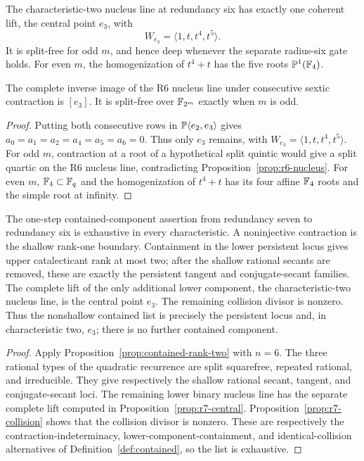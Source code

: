 The characteristic-two nucleus line at redundancy six has exactly one
coherent lift, the central point $e_3$, with
\[
W_{e_3}=\langle1,t,t^4,t^5\rangle.
\]
It is split-free for odd \(m\), and hence deep whenever the separate
radius-six gate holds.  For even \(m\), the homogenization of
\(t^4+t\) has the five roots \(\mathbb P^1(\mathbb F_4)\).

\begin{proposition}\label{prop:r7-central}%
%
The complete inverse image of the R6 nucleus line under consecutive
sextic contraction is $[e_3]$.  It is split-free over $\mathbb F_{2^m}$
exactly when $m$ is odd.
\end{proposition}

\begin{proof}
Putting both consecutive rows in
$\mathbb P\langle e_2,e_3\rangle$ gives
$a_0=a_1=a_2=a_4=a_5=a_6=0$.  Thus only $e_3$ remains, with
$W_{e_3}=\langle1,t,t^4,t^5\rangle$.  For odd $m$, contraction at a
root of a hypothetical split quintic would give a split quartic on the
R6 nucleus line, contradicting Proposition~\ref{prop:r6-nucleus}.  For
even $m$, $\mathbb F_4\subset\mathbb F_q$ and the homogenization of $t^4+t$ has its
four affine $\mathbb F_4$ roots and the simple root at infinity.
\end{proof}

\begin{corollary}
\label{cor:r7-contained}%
%
The one-step contained-component assertion from redundancy seven to
redundancy six is exhaustive in every characteristic.  A noninjective
contraction is the shallow rank-one
boundary.  Containment in the lower persistent locus gives upper
catalecticant rank at most two; after the shallow rational secants are
removed, these are exactly the persistent tangent and conjugate-secant
families.  The complete lift of the only additional lower component,
the characteristic-two nucleus line, is the central point \(e_3\).
The remaining collision divisor is nonzero.  Thus the
nonshallow contained list is precisely the persistent locus and, in
characteristic two, \(e_3\); there is no further contained component.
\end{corollary}

\begin{proof}
Apply Proposition~\ref{prop:contained-rank-two} with $n=6$.  The three
rational types of the quadratic recurrence are split squarefree,
repeated rational, and irreducible.  They give respectively the shallow
rational secant, tangent, and conjugate-secant loci.  The remaining
lower binary nucleus line has the separate complete lift computed in
Proposition~\ref{prop:r7-central}.  Proposition~\ref{prop:r7-collision}
shows that the collision divisor is nonzero.  These are respectively
the contraction-indeterminacy, lower-component-containment, and
identical-collision alternatives of Definition~\ref{def:contained},
so the list is exhaustive.
\end{proof}

